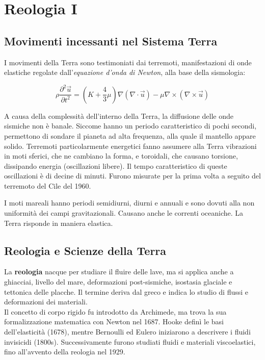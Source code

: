 \documentclass[a4paper,12pt]{book}
\begin{document}
\section{\textcolor{colore7}{\textcolor{colore7}{Reologia I}}}

\subsection{\textcolor{colore7}{Movimenti incessanti nel Sistema Terra}}

I movimenti della Terra sono testimoniati dai terremoti, manifestazioni di onde elastiche regolate dall'\textit{equazione d'onda di Newton}, alla base della sismologia:

\begin{equation}
    \rho \frac{\partial^2 \vec{u}}{\partial t^2} = \left( K + \frac{4}{3} \mu \right) \nabla (\nabla \cdot \vec{u}) - \mu \nabla \times (\nabla \times \vec{u})
    \label{eq:onda}
\end{equation}

A causa della complessità dell'interno della Terra, la diffusione delle onde sismiche non è banale.
Siccome hanno un periodo caratteristico di pochi secondi, permettono di sondare il pianeta ad alta frequenza, alla quale il mantello appare solido.
Terremoti particolarmente energetici fanno assumere alla Terra vibrazioni in moti sferici, che ne cambiano la forma, e toroidali, che causano torsione, dissipando energia (oscillazioni libere). 
Il tempo caratteristico di queste oscillazioni è di decine di minuti.
Furono misurate per la prima volta a seguito del terremoto del Cile del 1960.

I moti mareali hanno periodi semidiurni, diurni e annuali e sono dovuti alla non uniformità dei campi gravitazionali.
Causano anche le correnti oceaniche.
La Terra risponde in maniera elastica.

\subsection{\textcolor{colore2}{Reologia e Scienze della Terra}}

La \textbf{reologia} nacque per studiare il fluire delle lave, ma si applica anche a ghiacciai, livello del mare, deformazioni post-sismiche, isostasia glaciale e tettonica delle placche.
Il termine deriva dal greco e indica lo studio di flussi e deformazioni dei materiali.\\

\noindent
Il concetto di corpo rigido fu introdotto da Archimede, ma trova la sua formalizzazione matematica con Newton nel 1687.
Hooke definì le basi dell'elasticità (1678), mentre Bernoulli ed Eulero iniziarono a descrivere i fluidi invisicidi (1800s).
Successivamente furono studiati fluidi e materiali viscoelastici, fino all'avvento della reologia nel 1929.\\
\end{document}
